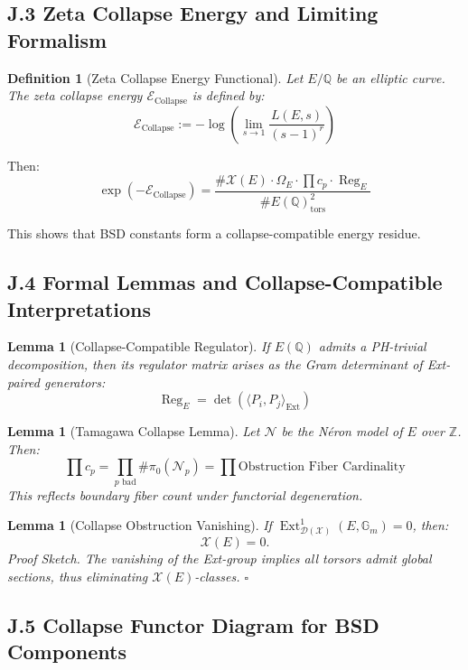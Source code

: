 \documentclass[11pt]{article}
\newtheorem{definition}[theorem]{Definition}
\newtheorem{lemma}[theorem]{Lemma}
\DeclareMathOperator{\Ext}{Ext}
\newcommand{\Sha}{\mathcal{X}}
\begin{document}
\subsection*{J.3 Zeta Collapse Energy and Limiting Formalism}

\begin{definition}[Zeta Collapse Energy Functional]
Let $E/\mathbb{Q}$ be an elliptic curve. The zeta collapse energy $\mathcal{E}_{\text{Collapse}}$ is defined by:
\[
\mathcal{E}_{\text{Collapse}} := -\log \left( \lim_{s \to 1} \frac{L(E,s)}{(s-1)^r} \right)
\]
\end{definition}

Then:
\[
\exp(-\mathcal{E}_{\text{Collapse}}) = \frac{\#\Sha(E)\cdot \Omega_E \cdot \prod c_p \cdot \operatorname{Reg}_E}{\# E(\mathbb{Q})_\text{tors}^2}
\]

This shows that BSD constants form a collapse-compatible energy residue.

\subsection*{J.4 Formal Lemmas and Collapse-Compatible Interpretations}

\begin{lemma}[Collapse-Compatible Regulator]
If $E(\mathbb{Q})$ admits a PH-trivial decomposition, then its regulator matrix arises as the Gram determinant of Ext-paired generators:
\[
\operatorname{Reg}_E = \det \left( \langle P_i, P_j \rangle_{\mathrm{Ext}} \right)
\]
\end{lemma}

\begin{lemma}[Tamagawa Collapse Lemma]
Let $\mathcal{N}$ be the Néron model of $E$ over $\mathbb{Z}$. Then:
\[
\prod c_p = \prod_{p \text{ bad}} \#\pi_0(\mathcal{N}_p) = \prod \text{Obstruction Fiber Cardinality}
\]
This reflects boundary fiber count under functorial degeneration.
\end{lemma}

\begin{lemma}[Collapse Obstruction Vanishing]
If $\Ext^1_{\mathcal{D}(\mathcal{X})}(E, \mathbb{G}_m) = 0$, then:
\[
\Sha(E) = 0.
\]
\textit{Proof Sketch.} The vanishing of the Ext-group implies all torsors admit global sections, thus eliminating $\Sha(E)$-classes.
\hfill$\square$
\end{lemma}

\subsection*{J.5 Collapse Functor Diagram for BSD Components}
\end{document}
